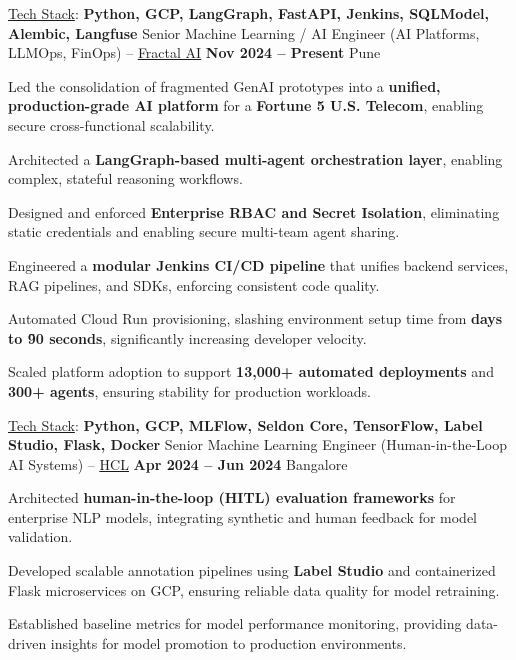 \documentclass[11pt, a4paper]{awesome-cv}
\begin{document}
\begin{cventries}

\cventry
  {\underline{Tech Stack}: \textbf{Python, GCP, LangGraph, FastAPI, Jenkins, SQLModel, Alembic, Langfuse}}
  {Senior Machine Learning / AI Engineer (AI Platforms, LLMOps, FinOps) – \underline{\href{https://fractal.ai/}{Fractal AI}}}
  {\textbf{Nov 2024 – Present}}
  {Pune}
  {
    \begin{cvitems}
      \item {Led the consolidation of fragmented GenAI prototypes into a \textbf{unified, production-grade AI platform} for a \textbf{Fortune 5 U.S. Telecom}, enabling secure cross-functional scalability.}
      \item {Architected a \textbf{LangGraph-based multi-agent orchestration layer}, enabling complex, stateful reasoning workflows.}
      \item {Designed and enforced \textbf{Enterprise RBAC and Secret Isolation}, eliminating static credentials and enabling secure multi-team agent sharing.}
      \item {Engineered a \textbf{modular Jenkins CI/CD pipeline} that unifies backend services, RAG pipelines, and SDKs, enforcing consistent code quality.}
      \item {Automated Cloud Run provisioning, slashing environment setup time from \textbf{days to \~90 seconds}, significantly increasing developer velocity.}
      \item {Scaled platform adoption to support \textbf{13,000+ automated deployments} and \textbf{300+ agents}, ensuring stability for production workloads.}
    \end{cvitems}
  }

\vspace{1.0em}

\cventry
  {\underline{Tech Stack}: \textbf{Python, GCP, MLFlow, Seldon Core, TensorFlow, Label Studio, Flask, Docker}}
  {Senior Machine Learning Engineer (Human-in-the-Loop AI Systems) – \underline{\href{https://www.hcltech.com/}{HCL}}}
  {\textbf{Apr 2024 – Jun 2024}}
  {Bangalore}
  {
    \begin{cvitems}
      \item {Architected \textbf{human-in-the-loop (HITL) evaluation frameworks} for enterprise NLP models, integrating synthetic and human feedback for model validation.}
      \item {Developed scalable annotation pipelines using \textbf{Label Studio} and containerized Flask microservices on GCP, ensuring reliable data quality for model retraining.}
      \item {Established baseline metrics for model performance monitoring, providing data-driven insights for model promotion to production environments.}
    \end{cvitems}
  }


\end{cventries}
\end{document}
